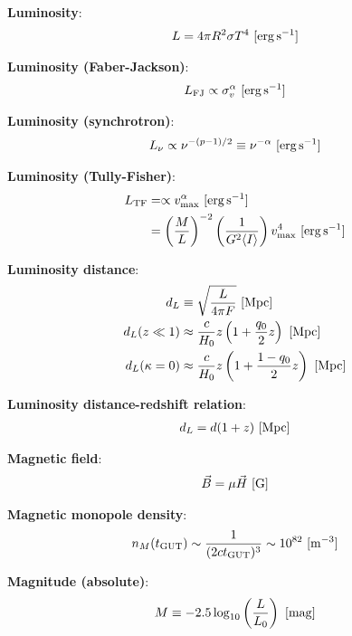 \documentclass[a4paper,10pt]{article}
\begin{document}
{\noindent}\textbf{Luminosity}:
\begin{align*}
    L=4\pi R^2\sigma T^4 ~ [{\rm erg\,s^{-1}}]
\end{align*}

{\noindent}\textbf{Luminosity (Faber-Jackson)}:
\begin{align*}
    L_\mathrm{FJ} \propto \sigma_v^\alpha ~ [{\rm erg\,s^{-1}}]
\end{align*}

{\noindent}\textbf{Luminosity (synchrotron)}:
\begin{align*}
    L_\nu \propto \nu^{-(p-1)/2}\equiv \nu^{-\alpha} ~ [{\rm erg\,s^{-1}}]
\end{align*}

{\noindent}\textbf{Luminosity (Tully-Fisher)}:
\begin{align*}
    L_\mathrm{TF} &= \propto v_\mathrm{max}^\alpha ~ [{\rm erg\,s^{-1}}] \\
    &= \left(\frac{M}{L}\right)^{-2} \left(\frac{1}{G^2\langle I\rangle}\right)v_\mathrm{max}^4 ~ [{\rm erg\,s^{-1}}]
\end{align*}

{\noindent}\textbf{Luminosity distance}:
\begin{align*}
    d_L &\equiv \sqrt{\frac{L}{4\pi F}} ~ [{\rm Mpc}] \\
    d_L(z\ll1) &\approx \frac{c}{H_0}z\left(1+\frac{q_0}{2}z\right) ~ [{\rm Mpc}] \\
    d_L(\kappa=0) &\approx \frac{c}{H_0}z \left(1+\frac{1-q_0}{2}z\right) ~ [{\rm Mpc}]
\end{align*}

{\noindent}\textbf{Luminosity distance-redshift relation}:
\begin{align*}
    d_L = d(1+z) ~ [{\rm Mpc}]
\end{align*}

{\noindent}\textbf{Magnetic field}:
\begin{align*}
    \vec{B} = \mu\vec{H} ~ [{\rm G}]
\end{align*}

{\noindent}\textbf{Magnetic monopole density}:
\begin{align*}
    n_M(t_\mathrm{GUT}) \sim \frac{1}{(2ct_\mathrm{GUT})^3} \sim 10^{82} ~ [{\rm m^{-3}}]
\end{align*}

{\noindent}\textbf{Magnitude (absolute)}:
\begin{align*}
    M \equiv -2.5\log_{10}\left(\frac{L}{L_0}\right) ~ [{\rm mag}]
\end{align*}
\end{document}
